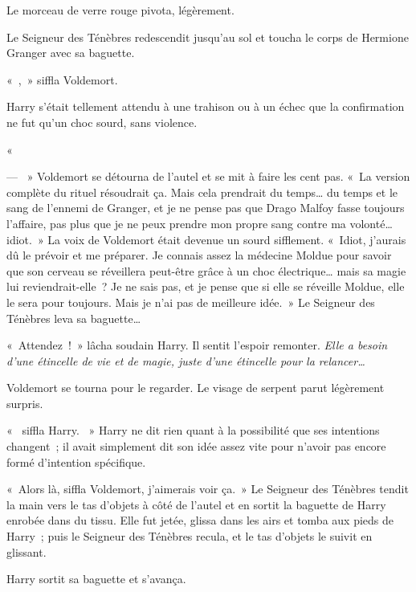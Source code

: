 Le morceau de verre rouge pivota, légèrement.

Le Seigneur des Ténèbres redescendit jusqu'au sol et toucha le corps de Hermione Granger avec sa baguette.

«~,~» siffla Voldemort.

Harry s'était tellement attendu à une trahison ou à un échec que la confirmation ne fut qu'un choc sourd, sans violence.

«~

--- ~» Voldemort se détourna de l'autel et se mit à faire les cent pas. «~La version complète du rituel résoudrait ça. Mais cela prendrait du temps… du temps et le sang de l'ennemi de Granger, et je ne pense pas que Drago Malfoy fasse toujours l'affaire, pas plus que je ne peux prendre mon propre sang contre ma volonté… idiot.~» La voix de Voldemort était devenue un sourd sifflement. «~Idiot, j'aurais dû le prévoir et me préparer. Je connais assez la médecine Moldue pour savoir que son cerveau se réveillera peut-être grâce à un choc électrique… mais sa magie lui reviendrait-elle~? Je ne sais pas, et je pense que si elle se réveille Moldue, elle le sera pour toujours. Mais je n'ai pas de meilleure idée.~» Le Seigneur des Ténèbres leva sa baguette…

«~Attendez~!~» lâcha soudain Harry. Il sentit l'espoir remonter. \emph{Elle a besoin d'une étincelle de vie et de magie, juste d'une étincelle pour la relancer…}

Voldemort se tourna pour le regarder. Le visage de serpent parut légèrement surpris.

«~ siffla Harry. ~» Harry ne dit rien quant à la possibilité que ses intentions changent~; il avait simplement dit son idée assez vite pour n'avoir pas encore formé d'intention spécifique.

«~Alors là, siffla Voldemort, j'aimerais voir ça.~» Le Seigneur des Ténèbres tendit la main vers le tas d'objets à côté de l'autel et en sortit la baguette de Harry enrobée dans du tissu. Elle fut jetée, glissa dans les airs et tomba aux pieds de Harry~; puis le Seigneur des Ténèbres recula, et le tas d'objets le suivit en glissant.

Harry sortit sa baguette et s'avança.

